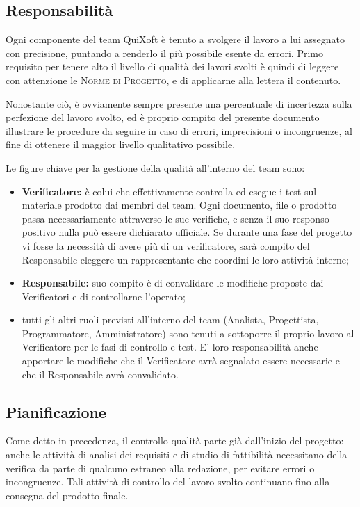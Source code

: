 \documentclass[11pt,a4paper]{article}
\begin{document}
\subsection{Responsabilità}
Ogni componente del team QuiXoft è tenuto a svolgere il lavoro a lui assegnato con precisione, puntando a renderlo il più possibile esente da errori.
Primo requisito per tenere alto il livello di qualità dei lavori svolti è quindi di leggere con attenzione le \textsc{Norme di Progetto}, e di applicarne alla lettera il contenuto.

Nonostante ciò, è ovviamente sempre presente una percentuale di incertezza sulla perfezione del lavoro svolto, ed è proprio compito del presente documento illustrare le procedure da seguire in caso di errori, imprecisioni o incongruenze, al fine di ottenere il maggior livello qualitativo possibile.

Le figure chiave per la gestione della qualità all'interno del team sono:
\begin{itemize}
	\item \textbf{Verificatore:} è colui che effettivamente controlla ed esegue i test sul materiale prodotto dai membri del team. Ogni documento, file o prodotto passa necessariamente attraverso le sue verifiche, e senza il suo responso positivo nulla può essere dichiarato ufficiale. Se durante una fase del progetto vi fosse la necessità di avere più di un verificatore, sarà compito del Responsabile eleggere un rappresentante che coordini le loro attività interne;
	\item \textbf{Responsabile:} suo compito è di convalidare le modifiche proposte dai Verificatori e di controllarne l'operato;
	\item tutti gli altri ruoli previsti all'interno del team (Analista, Progettista, Programmatore, Amministratore) sono tenuti a sottoporre il proprio lavoro al Verificatore per le fasi di controllo e test. E' loro responsabilità anche apportare le modifiche che il Verificatore avrà segnalato essere necessarie e che il Responsabile avrà convalidato.
\end{itemize}
\subsection{Pianificazione}
Come detto in precedenza, il controllo qualità parte già dall'inizio del progetto: anche le attività di analisi dei requisiti e di studio di fattibilità necessitano della verifica da parte di qualcuno estraneo alla redazione, per evitare errori o incongruenze.
Tali attività di controllo del lavoro svolto continuano fino alla consegna del prodotto finale.
\end{document}
